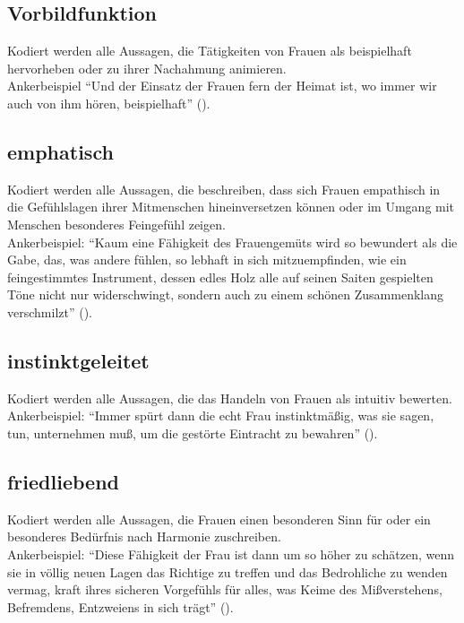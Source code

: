 \documentclass[12pt, titlepage=true, toc=bib]{scrartcl}
\begin{document}
{\subsection*{Vorbildfunktion}

Kodiert werden alle Aussagen, die Tätigkeiten von Frauen als beispielhaft hervorheben oder zu ihrer Nachahmung animieren.\\
Ankerbeispiel "`Und der Einsatz der Frauen fern der Heimat ist, wo immer wir auch von ihm hören, beispielhaft"' (\cite[669]{maltzahn_deutsche_1936}).

\subsection*{emphatisch}

Kodiert werden alle Aussagen, die beschreiben, dass sich Frauen empathisch in die Gefühlslagen ihrer Mitmenschen hineinversetzen können oder im Umgang mit Menschen besonderes Feingefühl zeigen.\\
Ankerbeispiel: "`Kaum eine Fähigkeit des Frauengemüts wird so bewundert als die Gabe, das, was andere fühlen, so lebhaft in sich mitzuempfinden, wie ein feingestimmtes Instrument, dessen edles Holz alle auf seinen Saiten gespielten Töne nicht nur widerschwingt, sondern auch zu einem schönen Zusammenklang verschmilzt"' (\cite[36]{weinhandl_wie_1941}).

\subsection*{instinktgeleitet}

Kodiert werden alle Aussagen, die das Handeln von Frauen als intuitiv bewerten.\\
Ankerbeispiel: "`Immer spürt dann die echt Frau instinktmäßig, was sie sagen, tun, unternehmen muß, um die gestörte Eintracht zu bewahren"' (\cite[36]{weinhandl_wie_1941}).

\subsection*{friedliebend}

Kodiert werden alle Aussagen, die Frauen einen besonderen Sinn für oder ein besonderes Bedürfnis nach Harmonie zuschreiben.\\
Ankerbeispiel: "`Diese Fähigkeit der Frau ist dann um so höher zu schätzen, wenn sie in völlig neuen Lagen das Richtige zu treffen und das Bedrohliche zu wenden vermag, kraft ihres sicheren Vorgefühls für alles, was Keime des Mißverstehens, Befremdens, Entzweiens in sich trägt"' (\cite[36]{weinhandl_wie_1941}).

}
\end{document}
